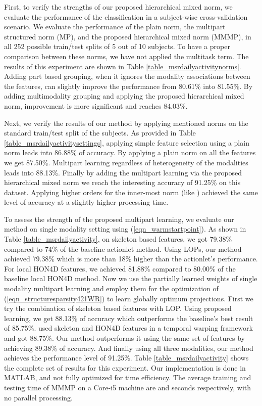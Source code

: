 \documentclass[9pt,technote,compsoc]{IEEEtran}
\begin{document}
First, to verify the strengths of our proposed hierarchical mixed norm, we evaluate the performance of the classification in a subject-wise cross-validation scenario. We evaluate the performance of the plain  norm, the multipart structured norm (MP), and the proposed hierarchical mixed norm (MMMP), in all 252 possible train/test splits of 5 out of 10 subjects. To have a proper comparison between these norms, we have not applied the multitask term. The results of this experiment are shown in Table \ref{table_msrdailyactivitynorms}. Adding part based grouping, when it ignores the modality associations between the features, can slightly improve the performance from 80.61\% into 81.55\%. By adding multimodality grouping and applying the proposed hierarchical mixed norm, improvement is more significant and reaches 84.03\%.

Next, we verify the results of our method by applying mentioned norms on the standard train/test split of the subjects. As provided in Table \ref{table_msrdailyactivitysettings}, applying simple feature selection using a plain  norm leads into 86.88\% of accuracy. By applying a plain  norm on all the features we get 87.50\%. Multipart learning regardless of heterogeneity of the modalities leads into 88.13\%. Finally by adding the multipart learning via the proposed hierarchical mixed norm we reach the interesting accuracy of 91.25\% on this dataset. Applying higher orders for the inner-most norm (like ) achieved the same level of accuracy at a slightly higher processing time.



To assess the strength of the proposed multipart learning, we evaluate our method on single modality setting using (\ref{eqn_warmstartpoint}). As shown in Table \ref{table_msrdailyactivity}, on skeleton based features, we got 79.38\% compared to 74\% of the baseline actionlet method. Using LOPs, our method achieved 79.38\% which is more than 18\% higher than the actionlet's performance. For local HON4D features, we achieved 81.88\% compared to 80.00\% of the baseline local HON4D method.
Now we use the partially learned weights of single modality multipart learning and employ them for the optimization of (\ref{eqn_structuresparsity421WR}) to learn globally optimum projections. First we try the combination of skeleton based features with LOP. Using proposed learning, we get 88.13\% of accuracy which outperforms the baseline's best result of 85.75\%. \cite{MMTW} used skeleton and HON4D features in a temporal warping framework and got 88.75\%. Our method outperforms it using the same set of features by achieving 89.38\% of accuracy. And finally using all three modalities, our method achieves the performance level of 91.25\%. Table \ref{table_msrdailyactivity} shows the complete set of results for this experiment. 
Our implementation is done in MATLAB, and not fully optimized for time efficiency. The average training and testing time of MMMP on a  Core-i5 machine are  and  seconds respectively, with no parallel processing.
\end{document}
